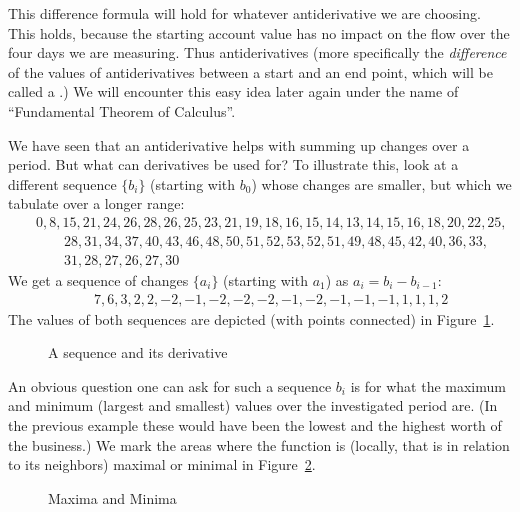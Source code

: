 This difference formula will hold for whatever antiderivative we are
choosing. This holds, because the starting account value has no impact on
the flow over the four days we are measuring. Thus antiderivatives (more
specifically the {\em difference} of the values of antiderivatives between a
start and an end point, which will be called a .)
We will encounter this easy idea later again under the name of
``Fundamental Theorem of Calculus''.
\medskip

We have seen that an antiderivative helps with summing up changes over a
period. But what can derivatives be used for? To illustrate this, look at
a different sequence $\{b_i\}$ (starting with $b_0$) whose changes are smaller, but which we tabulate
over a longer range:
\begin{eqnarray*}
&&
 0, 8, 15, 21, 24, 26, 28, 26, 25, 23, 21, 19, 18, 16, 15, 14, 13, 14, 15,
  16, 18, 20, 22, 25,\\
 &&\qquad 28, 31, 34, 37, 40, 43, 46, 48, 50, 51, 52, 53, 52, 51,
  49, 48, 45, 42, 40, 36, 33,\\
  &&\qquad 31, 28, 27, 26, 27, 30
\end{eqnarray*}
We get a sequence of changes $\{a_i\}$ (starting with $a_1$) as
$a_i=b_i-b_{i-1}$:
\begin{eqnarray*}
&&
7, 6, 3, 2, 2, -2, -1, -2, -2, -2, -1, -2, -1, -1, -1, 1, 1, 1, 2
\end{eqnarray*}
The values of both sequences are depicted (with points connected) in
Figure~\ref{figpythder}.

\begin{figure}
\begin{center}
\end{center}
\caption{A sequence and its derivative}
\label{figpythder}
\end{figure}

An obvious question one can ask for such a sequence $b_i$ is for what the
maximum and minimum (largest and smallest) values over the investigated
period are.
(In the previous example these would have been the lowest and the highest
worth of the business.) We mark the areas where the function is (locally,
that is in relation to its neighbors) maximal or minimal in
Figure~\ref{figpythder2}.

\begin{figure}
\begin{center}
\end{center}
\caption{Maxima and Minima}
\label{figpythder2}
\end{figure}

